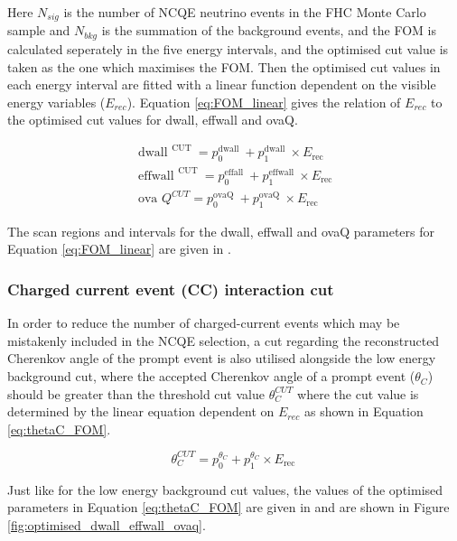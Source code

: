 Here $N_{sig}$ is the number of NCQE neutrino events in the FHC Monte Carlo sample and $N_{bkg}$ is the summation of the background events, and the FOM is calculated seperately in the five energy intervals, and the optimised cut value is taken as the one which maximises the FOM. Then the optimised cut values in each energy interval are fitted with a linear function dependent on the visible energy variables ($E_{rec}$). Equation \ref{eq:FOM_linear} gives the relation of $E_{rec}$ to the optimised cut values for dwall, effwall and ovaQ.

\begin{align}
    \text { dwall }^{\text {CUT }} =p_{0}^{\text {dwall }}+p_{1}^{\text {dwall }} \times E_{\text {rec }} \\
    \text { effwall }^{\text {CUT }}=p_{0}^{\text {effall }}+p_{1}^{\text {effwall }} \times E_{\text {rec }} \\
    \text { ova } Q^{C U T}=p_{0}^{\text {ovaQ }}+p_{1}^{\text {ovaQ }} \times E_{\text {rec }}
\label{eq:FOM_linear}
\end{align}


The scan regions and intervals for the dwall, effwall and ovaQ parameters for Equation \ref{eq:FOM_linear} are given in \cite{Abe_2019}. 

\subsubsection{Charged current event (CC) interaction cut}

In order to reduce the number of charged-current events which may be mistakenly included in the NCQE selection, a cut regarding the reconstructed Cherenkov angle of the prompt event  is also utilised alongside the low energy background cut, where the accepted Cherenkov angle of a prompt event ($\theta_{C}$) should be greater than the threshold cut value $\theta_{C}^{CUT}$ where the cut value is determined by the linear equation dependent on $E_{rec}$ as shown in Equation \ref{eq:thetaC_FOM}.

\begin{equation}
    \theta_{C}^{C U T}=p_{0}^{\theta_{C}}+p_{1}^{\theta_{C}} \times E_{\text {rec }}
    \label{eq:thetaC_FOM} 
\end{equation}

Just like for the low energy background cut values, the values of the optimised parameters in Equation \ref{eq:thetaC_FOM} are given in \cite{Abe_2019} and are shown in Figure \ref{fig:optimised_dwall_effwall_ovaq}.


